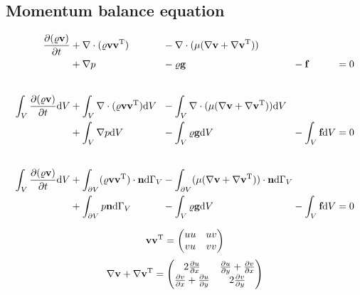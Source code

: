 \documentclass[a4paper,10pt]{scrartcl}
\begin{document}
\subsection{Momentum balance equation}
\begin{equation}
 \begin{alignedat}{6}
  \frac{\partial (\varrho \textbf{v})}{\partial t} &+ \nabla \cdot (\varrho \textbf{v} \textbf{v}^{\textup{T}}) &&- \nabla \cdot (\mu (\nabla \textbf{v} + \nabla \textbf{v}^{\textup{T}})) \\
    &+ \nabla p &&- \varrho \textbf{g} &&- \textbf{f} &&= 0 \\[2em]
  \int_{V} \frac{\partial (\varrho \textbf{v})}{\partial t} \text{d} V &+ \int_{V} \nabla \cdot (\varrho \textbf{v} \textbf{v}^{\textup{T}}) \text{d} V
    &&- \int_{V} \nabla \cdot (\mu (\nabla \textbf{v} + \nabla \textbf{v}^{\textup{T}})) \text{d} V \\
    &+ \int_{V} \nabla p \text{d} V &&- \int_{V} \varrho \textbf{g} \text{d} V &&- \int_{V} \textbf{f} \text{d} V &&= 0 \\[2em]
  \int_{V} \frac{\partial (\varrho \textbf{v})}{\partial t} \text{d} V &+ \int_{\partial V} (\varrho \textbf{v} \textbf{v}^{\textup{T}}) \cdot \textbf{n} \text{d} \Gamma_{V}
    &&- \int_{\partial V} (\mu (\nabla \textbf{v} + \nabla \textbf{v}^{\textup{T}})) \cdot \textbf{n} \text{d} \Gamma_{V} \\
    &+ \int_{\partial V} p \textbf{n} \text{d} \Gamma_{V} &&- \int_{V} \varrho \textbf{g} \text{d} V &&- \int_{V} \textbf{f} \text{d} V &&= 0
 \end{alignedat}
\end{equation}

\begin{equation}
 \textbf{v} \textbf{v}^{\textup{T}} = \begin{pmatrix}u u & u v \\ v u & v v \end{pmatrix}
\end{equation}
\begin{equation}
 \nabla \textbf{v} + \nabla \textbf{v}^{\textup{T}} =  \begin{pmatrix} 2 \frac{\partial u}{\partial x} & \frac{\partial u}{\partial y} + \frac{\partial v}{\partial x} \\
                                                        \frac{\partial v}{\partial x} + \frac{\partial u}{\partial y} & 2 \frac{\partial v}{\partial y}
                                                       \end{pmatrix}
\end{equation}
\end{document}
